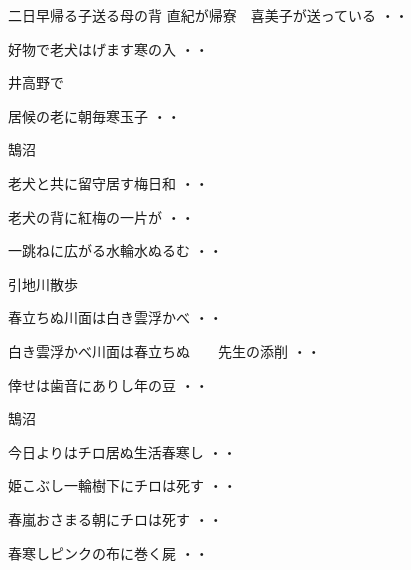 \begin{shiika}二日早帰る子送る母の背
\qquad\qquad\qquad \qquad 直紀が帰寮　喜美子が送っている
\hfill{・・}\end{shiika}
\begin{shiika}好物で老犬はげます寒の入
\hfill{・・}\end{shiika}
\vspace{0.6cm}
井高野で
\begin{shiika}居候の老に朝毎寒玉子
\hfill{・・}\end{shiika}
\vspace{0.6cm}
鵠沼
\begin{shiika}老犬と共に留守居す梅日和
\hfill{・・}\end{shiika}
\begin{shiika}老犬の背に紅梅の一片が
\hfill{・・}\end{shiika}
\begin{shiika}一跳ねに広がる水輪水ぬるむ
\hfill{・・}\end{shiika}
\qquad\qquad\qquad 引地川散歩
\begin{shiika}春立ちぬ川面は白き雲浮かべ
\hfill{・・}\end{shiika}
\begin{shiika}白き雲浮かべ川面は春立ちぬ　　先生の添削
\hfill{・・}\end{shiika}
\begin{shiika}倖せは歯音にありし年の豆
\hfill{・・}\end{shiika}
\vspace{0.6cm}
鵠沼
\begin{shiika}今日よりはチロ居ぬ生活春寒し
\hfill{・・}\end{shiika}
\begin{shiika}姫こぶし一輪樹下にチロは死す
\hfill{・・}\end{shiika}
\begin{shiika}春嵐おさまる朝にチロは死す
\hfill{・・}\end{shiika}
\begin{shiika}春寒しピンクの布に巻く屍
\hfill{・・}\end{shiika}
